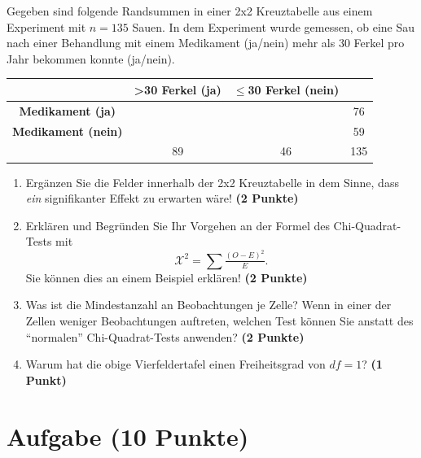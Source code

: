 \documentclass[a4paper, 9pt]{scrartcl}\usepackage[]{graphicx}\usepackage[]{xcolor}
\begin{document}
Gegeben sind folgende Randsummen in einer 2x2 Kreuztabelle aus einem
Experiment mit $n = 135$ Sauen. In dem Experiment wurde gemessen,
ob eine Sau nach einer Behandlung mit einem Medikament (ja/nein)
mehr als 30 Ferkel pro Jahr bekommen konnte (ja/nein).

\vspace{5Ex}

\begin{center}
  \Large
  \begin{tabular}{c|c|c|c}
     & \textbf{>30 Ferkel (ja)} & \textbf{$\leq$30 Ferkel (nein)} &  \strut\\
    \hline
    \textbf{Medikament (ja)} & \phantom{100}  & \phantom{100}  &   76  \strut\\
    \hline
    \textbf{Medikament (nein)} & \phantom{100}  & \phantom{100}  &   59   \strut\\
    \hline
     &  89 &  46 &  135  \strut\\
  \end{tabular}
\end{center}



\vspace{5Ex}

\begin{enumerate}
\item Erg{\"a}nzen Sie die Felder innerhalb der 2x2 Kreuztabelle in dem Sinne,
  dass \textit{ein} signifikanter Effekt zu erwarten w{\"a}re!
  \textbf{(2 Punkte)}
\item Erkl{\"a}ren und Begr{\"u}nden Sie Ihr Vorgehen an der Formel des
  Chi-Quadrat-Tests mit
  \begin{equation*}
  \mathcal{X}^2 = \sum\tfrac{(O - E)^2}{E}.  
  \end{equation*}
  Sie k{\"o}nnen dies an einem Beispiel erkl{\"a}ren! \textbf{(2 Punkte)}
\item Was ist die Mindestanzahl an Beobachtungen je Zelle? Wenn in einer
  der Zellen weniger Beobachtungen auftreten, welchen Test k{\"o}nnen Sie
  anstatt des "`normalen"' Chi-Quadrat-Tests anwenden? \textbf{(2 Punkte)}
\item Warum hat die obige Vierfeldertafel einen Freiheitsgrad von $df=1$?
  \textbf{(1 Punkt)}
\end{enumerate} 
\clearpage

\section{Aufgabe \hfill (10 Punkte)}
\end{document}
